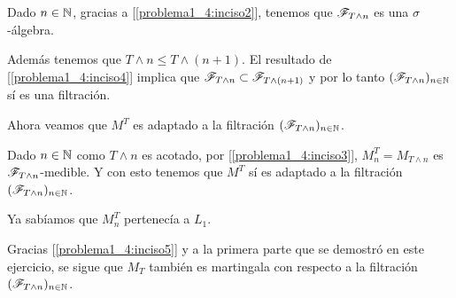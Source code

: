 	Dado $n \in \mathbb{N}$, gracias a [\ref{problema1_4:inciso2}], tenemos que $\mathscr{F}_{T \wedge n}$ es una $\sigma$-álgebra.\pn

	Además tenemos que $T \wedge n \leq T \wedge (n+1)$. El resultado de [\ref{problema1_4:inciso4}] implica que 
	$\mathscr{F}_{T \wedge n} \subset \mathscr{F}_{T \wedge (n+1)}$ y por lo tanto $(\mathscr{F}_{T \wedge n})_{n \in \mathbb{N}}$ sí es una filtración.\pn
	
	Ahora veamos que $M^T$ es adaptado a la filtración $(\mathscr{F}_{T \wedge n})_{n \in \mathbb{N}}$.\pn

	Dado $n \in \mathbb{N}$ como $T \wedge n$ es acotado, por [\ref{problema1_4:inciso3}], $M_n^T = M_{T \wedge n}$ es $\mathscr{F}_{T \wedge n}$-medible.
	Y con esto tenemos que $M^T$ sí es adaptado a la filtración $(\mathscr{F}_{T \wedge n})_{n \in \mathbb{N}}$.\pn
	
	Ya sabíamos que $M_n^T$ pertenecía a $L_1$.\pn
	
	Gracias [\ref{problema1_4:inciso5}] y a la primera parte que se demostró en este ejercicio, se sigue que $M_T$ también es
	martingala con respecto a la filtración $(\mathscr{F}_{T \wedge n})_{n \in \mathbb{N}}$.